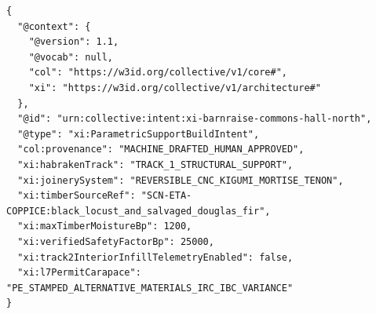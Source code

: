 \begin{lstlisting}[language=jsonld,caption={Canonical Wave D \texttt{ParametricSupportBuildIntent} pairing reversible Kigumi timber joinery with Habraken Track-1 structural FEA gates and Track-2 $R_0$ interior privacy.}]
{
  "@context": {
    "@version": 1.1,
    "@vocab": null,
    "col": "https://w3id.org/collective/v1/core#",
    "xi": "https://w3id.org/collective/v1/architecture#"
  },
  "@id": "urn:collective:intent:xi-barnraise-commons-hall-north",
  "@type": "xi:ParametricSupportBuildIntent",
  "col:provenance": "MACHINE_DRAFTED_HUMAN_APPROVED",
  "xi:habrakenTrack": "TRACK_1_STRUCTURAL_SUPPORT",
  "xi:joinerySystem": "REVERSIBLE_CNC_KIGUMI_MORTISE_TENON",
  "xi:timberSourceRef": "SCN-ETA-COPPICE:black_locust_and_salvaged_douglas_fir",
  "xi:maxTimberMoistureBp": 1200,
  "xi:verifiedSafetyFactorBp": 25000,
  "xi:track2InteriorInfillTelemetryEnabled": false,
  "xi:l7PermitCarapace": "PE_STAMPED_ALTERNATIVE_MATERIALS_IRC_IBC_VARIANCE"
}
\end{lstlisting}

